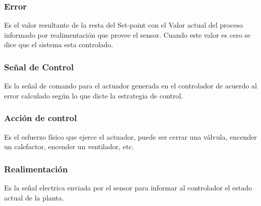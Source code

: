 \documentclass[letterpaper,journal]{ieeetran}
\begin{document}
\begin{itemize}
	\subsubsection{Error} Es el valor resultante de la resta del Set-point con el Valor actual del proceso informado por realimentación que provee el sensor. Cuando este valor es cero se dice que el sistema esta controlado.
	
	\subsubsection{Señal de Control} Es la señal de comando para el actuador  generada en el controlador de acuerdo al error calculado según lo que dicte la estrategia de control.
	
	\subsubsection{Acción de control} Es el esfuerzo físico que ejerce el actuador, puede ser cerrar una válvula, encender un calefactor, encender un ventilador, etc.
	
	\subsubsection{Realimentación} Es la señal electrica enviada por el sensor para informar al controlador el estado actual de la planta.
\end{itemize}
\end{document}
